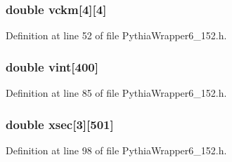 \subsubsection{\setlength{\rightskip}{0pt plus 5cm}double {\bf vckm}[4][4]}\label{PythiaWrapper6__152_8h_d3af0b3261dabd4faa1d7b65d12b8cbc}




Definition at line 52 of file Pythia\-Wrapper6\_\-152.h.
\subsubsection{\setlength{\rightskip}{0pt plus 5cm}double {\bf vint}[400]}\label{PythiaWrapper6__152_8h_b2af52c6eb9d154e3175fdac9c86682e}




Definition at line 85 of file Pythia\-Wrapper6\_\-152.h.
\subsubsection{\setlength{\rightskip}{0pt plus 5cm}double {\bf xsec}[3][501]}\label{PythiaWrapper6__152_8h_0258183160ed1cbf857bd1a02456e11a}




Definition at line 98 of file Pythia\-Wrapper6\_\-152.h.